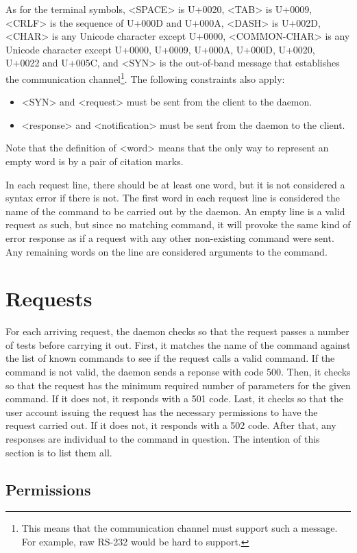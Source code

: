 \documentclass[twoside,a4paper,11pt]{article}
\begin{document}
As for the terminal symbols, <SPACE> is U+0020, <TAB> is U+0009,
<CRLF> is the sequence of U+000D and U+000A, <DASH> is U+002D, <CHAR>
is any Unicode character except U+0000, <COMMON-CHAR> is any
Unicode character except U+0000, U+0009, U+000A, U+000D, U+0020,
U+0022 and U+005C, and <SYN> is the out-of-band message that
establishes the communication channel\footnote{This means that the
  communication channel must support such a message. For example, raw
  RS-232 would be hard to support.}. The following constraints also
apply:
\begin{itemize}
\item <SYN> and <request> must be sent from the client to the daemon.
\item <response> and <notification> must be sent from the daemon to
  the client.
\end{itemize}
Note that the definition of <word> means that the only way to
represent an empty word is by a pair of citation marks.

In each request line, there should be at least one word, but it is not
considered a syntax error if there is not. The first word in each
request line is considered the name of the command to be carried out
by the daemon. An empty line is a valid request as such, but since no
matching command, it will provoke the same kind of error response as
if a request with any other non-existing command were sent. Any
remaining words on the line are considered arguments to the command.

\section{Requests}
For each arriving request, the daemon checks so that the request
passes a number of tests before carrying it out. First, it matches the
name of the command against the list of known commands to see if the
request calls a valid command. If the command is not valid, the daemon
sends a reponse with code 500. Then, it checks so that the request has
the minimum required number of parameters for the given command. If it
does not, it responds with a 501 code. Last, it checks so that the
user account issuing the request has the necessary permissions to have
the request carried out. If it does not, it responds with a 502
code. After that, any responses are individual to the command in
question. The intention of this section is to list them all.

\subsection{Permissions}
\end{document}
